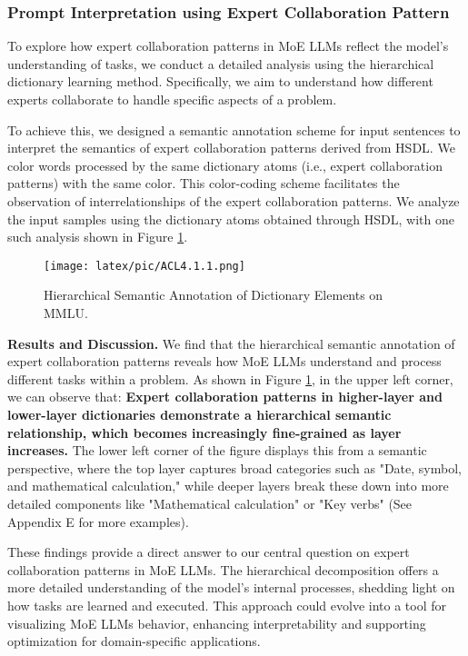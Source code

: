 \documentclass[11pt]{article}
\begin{document}
\subsubsection{Prompt Interpretation using Expert Collaboration Pattern }
To explore how expert collaboration patterns in MoE LLMs reflect the model’s understanding of tasks, we conduct a detailed analysis using the hierarchical dictionary learning method. Specifically, we aim to understand how different experts collaborate to handle specific aspects of a problem.

To achieve this, we designed a semantic annotation scheme for input sentences to interpret the semantics of expert collaboration patterns derived from HSDL. We color words processed by the same dictionary atoms (i.e., expert collaboration patterns) with the same color. This color-coding scheme facilitates the observation of interrelationships of the expert collaboration patterns. We analyze the input samples using the dictionary atoms obtained through HSDL, with one such analysis shown in Figure \ref{Semantic_Annotation}. 


\begin{figure}[ht]
    \centering
    \texttt{[image: latex/pic/ACL4.1.1.png]}
    \caption{Hierarchical Semantic Annotation of Dictionary Elements on MMLU.}
    \label{Semantic_Annotation}
\end{figure}

\textbf{Results and Discussion.} We find that the hierarchical semantic annotation of expert collaboration patterns reveals how MoE LLMs understand and process different tasks within a problem. As shown in Figure \ref{Semantic_Annotation}, in the upper left corner, we can observe that:  \textbf{Expert collaboration patterns in higher-layer and lower-layer dictionaries demonstrate a hierarchical  semantic relationship, which becomes increasingly fine-grained as layer increases.%
} The lower left corner of the figure displays this from a semantic perspective, where the top layer captures broad categories such as "Date, symbol, and mathematical calculation," while deeper layers break these down into more detailed components like "Mathematical calculation" or "Key verbs" (See Appendix E for more examples).


These findings provide a direct answer to our central question on expert collaboration patterns in MoE LLMs. The hierarchical decomposition offers a more detailed understanding of the model's internal processes, shedding light on how tasks are learned and executed.  This approach could evolve into a tool for visualizing MoE LLMs behavior, enhancing interpretability and supporting optimization for domain-specific applications.
\end{document}
